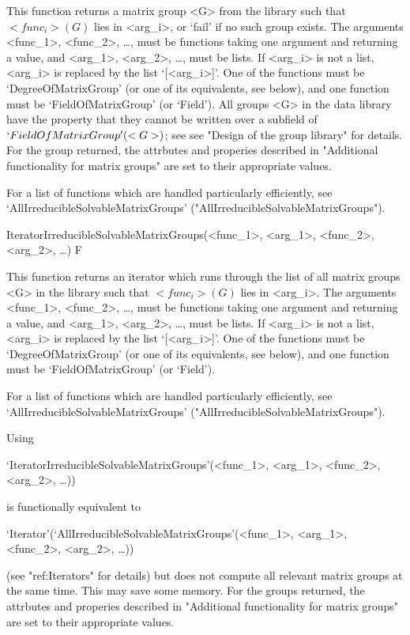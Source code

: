 This function returns a matrix group <G> from the {\IRREDSOL} library such that
$<func_i>(G)$ lies in <arg_i>, or `fail' if no such group exists. The arguments <func_1>,
<func_2>, \dots, must be {\GAP} functions taking one argument and returning a value, and
<arg_1>, <arg_2>, \dots,  must be lists. If <arg_i> is not a list, <arg_i> is replaced by
the list `[<arg_i>]'. One of the functions must be `DegreeOfMatrixGroup' (or one of its
equivalents, see below), and one function must be  `FieldOfMatrixGroup' (or `Field'). All
groups <G> in the data library have the property that they cannot be written over a
subfield of $`FieldOfMatrixGroup'(<G>)$; see see "Design of the group library" for details. 
For the group returned, the attrbutes and properies described in
"Additional functionality for matrix groups" are set to their appropriate values.


For a list of functions which are handled particularly efficiently, see
`AllIrreducibleSolvableMatrixGroups' ("AllIrreducibleSolvableMatrixGroups").

\>IteratorIrreducibleSolvableMatrixGroups(<func_1>, <arg_1>, <func_2>, <arg_2>, \dots) F

This function returns an iterator which runs through the list of all matrix groups <G>
in the  {\IRREDSOL} library such that
$<func_i>(G)$ lies in <arg_i>. The arguments <func_1>, <func_2>, \dots,
must be {\GAP} functions taking one argument and returning a value, and <arg_1>, <arg_2>, \dots, 
must be lists. If <arg_i> is not a list, <arg_i> is replaced by the list `[<arg_i>]'.
One of the functions must be `DegreeOfMatrixGroup' (or one of its equivalents, see below), and one
function must be  `FieldOfMatrixGroup' (or `Field'). 

For a list of functions which are handled particularly efficiently, see
`AllIrreducibleSolvableMatrixGroups' ("AllIrreducibleSolvableMatrixGroups").

Using 

`IteratorIrreducibleSolvableMatrixGroups'(<func_1>, <arg_1>, <func_2>, <arg_2>, \dots)) 

is functionally equivalent to 

`Iterator'(`AllIrreducibleSolvableMatrixGroups'(<func_1>, <arg_1>, <func_2>, <arg_2>, \dots))

(see "ref:Iterators" for details) but does not compute all relevant matrix groups at the same time. 
This may save some memory. 
For the groups returned, the attrbutes and properies described in
"Additional functionality for matrix groups" are set to their appropriate values.







